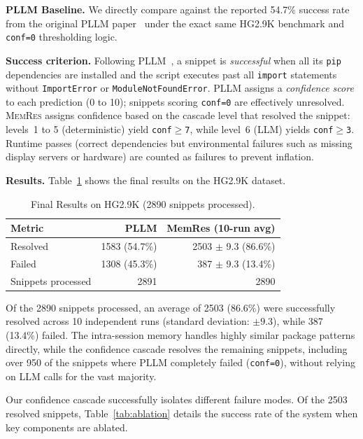 \documentclass[sigconf,screen]{acmart}
\begin{document}
\textbf{PLLM Baseline.}
We directly compare against the reported 54.7\% success rate from the original PLLM paper~\cite{bartlett2025} under the exact same HG2.9K benchmark and \texttt{conf=0} thresholding logic.

\textbf{Success criterion.}
Following PLLM~\cite{bartlett2025}, a snippet is \emph{successful} when all its \texttt{pip} dependencies are installed and the script executes past all \texttt{import} statements without \texttt{ImportError} or \texttt{ModuleNotFoundError}.
PLLM assigns a \emph{confidence score} to each prediction (0 to 10); snippets scoring \texttt{conf=0} are effectively unresolved.
\textsc{MemRes} assigns confidence based on the cascade level that resolved the snippet: levels~1 to 5 (deterministic) yield \texttt{conf$\geq$7}, while level~6 (LLM) yields \texttt{conf$\geq$3}.
Runtime passes (correct dependencies but environmental failures such as missing display servers or hardware) are counted as failures to prevent inflation.

\textbf{Results.}
Table~\ref{tab:results} shows the final results on the HG2.9K dataset.

\begin{table}[t]
\caption{Final Results on HG2.9K (\num{2890} snippets processed).}
\label{tab:results}
\begin{tabular}{lrr}
\toprule
\textbf{Metric} & \textbf{PLLM} & \textbf{MemRes (10-run avg)} \\
\midrule
Resolved & \num{1583} (54.7\%) & \num{2503} $\pm$ 9.3 (86.6\%) \\
Failed & \num{1308} (45.3\%) & 387 $\pm$ 9.3 (13.4\%) \\
Snippets processed & \num{2891} & \num{2890} \\
\bottomrule
\end{tabular}
\end{table}

Of the \num{2890} snippets processed, an average of \num{2503} (86.6\%) were successfully resolved across 10 independent runs (standard deviation: $\pm 9.3$), while 387 (13.4\%) failed.
The intra-session memory handles highly similar package patterns directly, while the confidence cascade resolves the remaining snippets, including over 950 of the snippets where PLLM completely failed (\texttt{conf=0}), without relying on LLM calls for the vast majority.

Our confidence cascade successfully isolates different failure modes. Of the \num{2503} resolved snippets, Table~\ref{tab:ablation} details the success rate of the system when key components are ablated.
\end{document}

